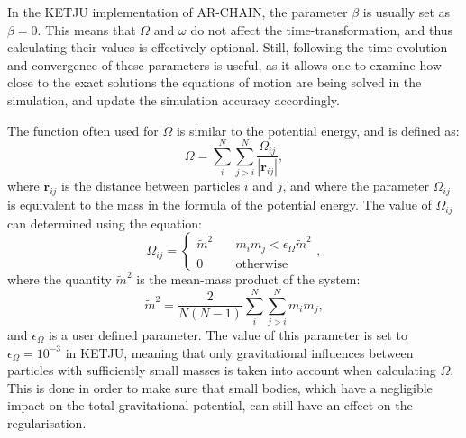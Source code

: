 \documentclass[english, twoside]{HYgradu}
\begin{document}
In the KETJU implementation of AR-CHAIN, the parameter $\beta$ is usually set as $\beta = 0$. This means that $\Omega$ and $\omega$ do not affect the time-transformation, and thus calculating their values is effectively optional. Still, following the time-evolution and convergence of these parameters is useful, as it allows one to examine how close to the exact solutions the equations of motion are being solved in the simulation, and update the simulation accuracy accordingly.   

The function often used for $\Omega$ is similar to the potential energy, and is defined as:
\begin{equation}
\Omega = \displaystyle\sum^N_i \displaystyle\sum^N_{j > i} \frac{\Omega_{ij}}{|\mathbf{r}_{ij}|}, \label{eq:ketju_omega}
\end{equation}
where $\mathbf{r}_{ij}$ is the distance between particles $i$ and $j$, and where the parameter $\Omega_{ij}$ is equivalent to the mass in the formula of the potential energy. The value of $\Omega_{ij}$ can determined using the equation:
\begin{equation}
\Omega_{ij} = 
\begin{cases}
\tilde{m}^2 &\quad m_i m_j < \epsilon_\Omega \tilde{m}^2 \\
0 &\quad \mathrm{otherwise}
\end{cases},
\end{equation}
where the quantity $\tilde{m}^2$ is the mean-mass product of the system:
\begin{equation}
\tilde{m}^2 = \frac{2}{N(N-1)} \displaystyle\sum^N_i \displaystyle\sum^N_{j > i} m_i m_j,
\end{equation}
and $\epsilon_\Omega$ is a user defined parameter. The value of this parameter is set to $\epsilon_\Omega = 10^{-3}$ in KETJU, meaning that only gravitational influences between particles with sufficiently small masses is taken into account when calculating $\Omega$. This is done in order to make sure that small bodies, which have a negligible impact on the total gravitational potential, can still have an effect on the regularisation. 
\end{document}
